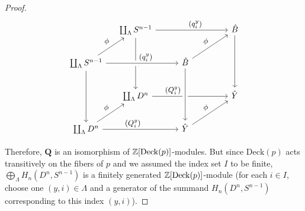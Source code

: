 \begin{proof}
\[
\begin{tikzcd}[row sep={40,between origins},column sep={60,between origins},every label/.append style={font=\small}]
&\coprod_{\Lambda}S^{n-1}\ar["(q_i^y)"{pos=.55}]{rr}\ar["b"{pos=.5}]{dd}&&\hat{B}\ar{dd}\\
\coprod_{\Lambda}S^{n-1}\ar["(q_i^y)"{pos=.55},crossing over]{rr}\ar{dd}\ar["\phi"{pos=.5}]{ur}&&\hat{B}\ar["\phi"{pos=.5}]{ur}\\
&\coprod_{\Lambda}D^n\ar["(Q_i^y)"{pos=.275}]{rr}&&\hat{Y}\\
\coprod_{\Lambda}D^n\ar["(Q_i^y)"{pos=.4}]{rr}\ar["\phi"{pos=.5}]{ur}&&\hat{Y}\ar[from=uu,crossing over]\ar["\phi"{pos=.5}]{ur}
\end{tikzcd}
\]  

Therefore, $\bm{Q}$ is an isomorphism of $\mathbb{Z}[\mathrm{Deck}(p)]$-modules. But since $\mathrm{Deck}(p)$ acts transitively on the fibers of $p$ and we assumed the index set $I$ to be finite, $\bigoplus_{\Lambda} H_n(D^n,S^{n-1})$ is a finitely generated $\mathbb{Z}[\mathrm{Deck}(p)]$-module (for each $i \in I$, choose one $(y,i) \in \Lambda$ and a generator of the summand $H_n(D^n,S^{n-1})$ corresponding to this index $(y,i)$).
\end{proof}

